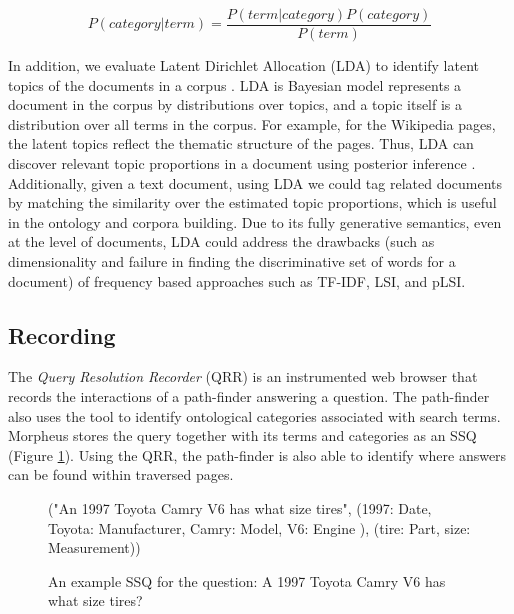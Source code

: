 \begin{equation}
\label{eq:bayesrule}
P (category | term) = \frac{P(term | category) P(category)}{P(term)}
\end{equation}    

In addition, we evaluate Latent Dirichlet Allocation (LDA) to identify latent topics of the documents in a corpus \cite{Blei2003latentdirichlet}.  LDA is Bayesian model represents a document in the corpus by distributions over topics, and a topic itself is a distribution over all  terms in the corpus.  For example, for the Wikipedia pages, the latent topics reflect the thematic structure of the pages. Thus, LDA can discover relevant topic proportions in a document using posterior inference \cite{Blei2003latentdirichlet}. Additionally, given a text document, using LDA we could tag related documents by matching the similarity over the estimated topic proportions, which is useful in the ontology and corpora building.  Due to its fully generative semantics, even at the level of documents, LDA could address the drawbacks (such as dimensionality and failure in finding the discriminative set of words for a document) of frequency based approaches such as TF-IDF, LSI, and pLSI.


\subsection{ Recording}
\label{sec:query_processing}
  
The \emph{Query Resolution Recorder} (QRR) is an instrumented web browser that records the interactions of a path-finder answering a question. The path-finder also uses the tool to identify ontological categories associated with search terms. Morpheus stores the query together with its terms and categories as an SSQ (Figure \ref{fig:ssq_example}). Using the QRR, the path-finder is also able to identify where answers can be found within traversed pages.

\begin{figure}[t]
\label{fig:ssq_example}
("An  1997 Toyota Camry V6 has what size tires", 
     (1997: Date, Toyota: Manufacturer, Camry: Model, V6: Engine ),
     (tire: Part, size: Measurement))
 
\caption{An example SSQ for the question: A 1997 Toyota Camry V6 has what size tires?}
\end{figure} 

